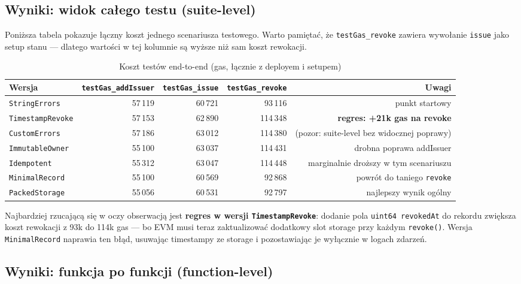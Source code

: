 \documentclass[11pt,a4paper]{article}
\begin{document}
\subsection{Wyniki: widok całego testu (suite-level)}

Poniższa tabela pokazuje łączny koszt jednego scenariusza testowego.
Warto pamiętać, że \texttt{testGas\_revoke} zawiera wywołanie \texttt{issue}
jako setup stanu --- dlatego wartości w tej kolumnie są wyższe niż sam koszt rewokacji.

\begin{table}[H]
\centering
\caption{Koszt testów end-to-end (gas, łącznie z deployem i setupem)}
\begin{tabular}{lrrrr}
\toprule
Wersja & \texttt{testGas\_addIssuer} & \texttt{testGas\_issue} & \texttt{testGas\_revoke} & Uwagi \\
\midrule
\texttt{StringErrors}    & 57\,119 & 60\,721 &  93\,116 & punkt startowy \\
\rowcolor{regresscolor}
\texttt{TimestampRevoke} & 57\,153 & 62\,890 & 114\,348 & \textbf{regres: +21k gas na revoke} \\
\texttt{CustomErrors}    & 57\,186 & 63\,012 & 114\,380 & (pozor: suite-level bez widocznej poprawy) \\
\texttt{ImmutableOwner}  & 55\,100 & 63\,037 & 114\,431 & drobna poprawa addIssuer \\
\texttt{Idempotent}      & 55\,312 & 63\,047 & 114\,448 & marginalnie droższy w tym scenariuszu \\
\rowcolor{bestcolor}
\texttt{MinimalRecord}   & 55\,100 & 60\,569 &  92\,868 & powrót do taniego \texttt{revoke} \\
\rowcolor{bestcolor}
\texttt{PackedStorage}   & 55\,056 & 60\,531 &  92\,797 & najlepszy wynik ogólny \\
\bottomrule
\end{tabular}
\end{table}

\noindent Najbardziej rzucającą się w oczy obserwacją jest \textbf{regres w wersji
\texttt{TimestampRevoke}}: dodanie pola \texttt{uint64 revokedAt} do rekordu
zwiększa koszt rewokacji z 93k do 114k gas --- bo EVM musi teraz
zaktualizować dodatkowy slot storage przy każdym \texttt{revoke()}.
Wersja \texttt{MinimalRecord} naprawia ten błąd, usuwając timestampy ze storage
i pozostawiając je wyłącznie w logach zdarzeń.

\subsection{Wyniki: funkcja po funkcji (function-level)}
\end{document}
